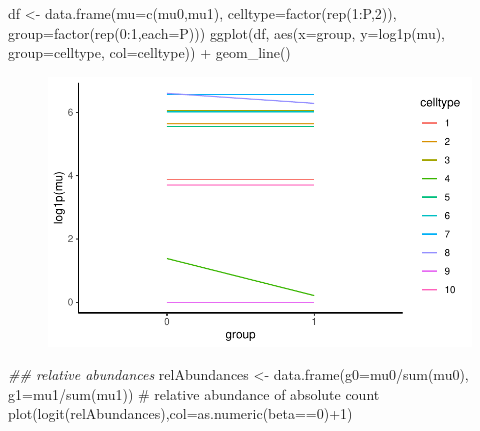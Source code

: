 \documentclass[
  letterpaper,
  DIV=11,
  numbers=noendperiod]{scrartcl}
\newenvironment{Shaded}{\begin{snugshade}}{\end{snugshade}}
\newcommand{\AttributeTok}[1]{\textcolor[rgb]{0.40,0.45,0.13}{#1}}
\newcommand{\CommentTok}[1]{\textcolor[rgb]{0.37,0.37,0.37}{#1}}
\newcommand{\DecValTok}[1]{\textcolor[rgb]{0.68,0.00,0.00}{#1}}
\newcommand{\DocumentationTok}[1]{\textcolor[rgb]{0.37,0.37,0.37}{\textit{#1}}}
\newcommand{\FunctionTok}[1]{\textcolor[rgb]{0.28,0.35,0.67}{#1}}
\newcommand{\NormalTok}[1]{\textcolor[rgb]{0.00,0.23,0.31}{#1}}
\newcommand{\OtherTok}[1]{\textcolor[rgb]{0.00,0.23,0.31}{#1}}
\newcommand{\SpecialCharTok}[1]{\textcolor[rgb]{0.37,0.37,0.37}{#1}}
\begin{document}
\begin{Shaded}
\begin{Highlighting}[]
\NormalTok{df }\OtherTok{\textless{}{-}} \FunctionTok{data.frame}\NormalTok{(}\AttributeTok{mu=}\FunctionTok{c}\NormalTok{(mu0,mu1),}
                 \AttributeTok{celltype=}\FunctionTok{factor}\NormalTok{(}\FunctionTok{rep}\NormalTok{(}\DecValTok{1}\SpecialCharTok{:}\NormalTok{P,}\DecValTok{2}\NormalTok{)),}
                 \AttributeTok{group=}\FunctionTok{factor}\NormalTok{(}\FunctionTok{rep}\NormalTok{(}\DecValTok{0}\SpecialCharTok{:}\DecValTok{1}\NormalTok{,}\AttributeTok{each=}\NormalTok{P)))}
\FunctionTok{ggplot}\NormalTok{(df, }\FunctionTok{aes}\NormalTok{(}\AttributeTok{x=}\NormalTok{group, }\AttributeTok{y=}\FunctionTok{log1p}\NormalTok{(mu), }\AttributeTok{group=}\NormalTok{celltype, }\AttributeTok{col=}\NormalTok{celltype)) }\SpecialCharTok{+}
  \FunctionTok{geom\_line}\NormalTok{()}
\end{Highlighting}
\end{Shaded}

\begin{figure}[H]

{\centering \includegraphics{221215_simulationCLRBias_files/figure-pdf/unnamed-chunk-2-1.pdf}

}

\end{figure}

\begin{Shaded}
\begin{Highlighting}[]
\DocumentationTok{\#\# relative abundances}
\NormalTok{relAbundances }\OtherTok{\textless{}{-}} \FunctionTok{data.frame}\NormalTok{(}\AttributeTok{g0=}\NormalTok{mu0}\SpecialCharTok{/}\FunctionTok{sum}\NormalTok{(mu0),}
                            \AttributeTok{g1=}\NormalTok{mu1}\SpecialCharTok{/}\FunctionTok{sum}\NormalTok{(mu1)) }\CommentTok{\# relative abundance of absolute count}
\FunctionTok{plot}\NormalTok{(}\FunctionTok{logit}\NormalTok{(relAbundances),}\AttributeTok{col=}\FunctionTok{as.numeric}\NormalTok{(beta}\SpecialCharTok{==}\DecValTok{0}\NormalTok{)}\SpecialCharTok{+}\DecValTok{1}\NormalTok{)}
\end{Highlighting}
\end{Shaded}
\end{document}
